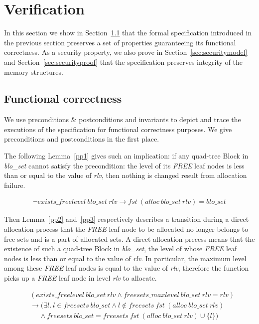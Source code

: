 \section{Verification}
In this section we show in Section~\ref{sec:functional} that the formal specification introduced in the previous section preserves a set of properties guaranteeing its functional correctness. As a security property, we also prove in Section~\ref{sec:securitymodel} and Section~\ref{sec:securityproof} that the specification preserves integrity of the memory structures.

\subsection{Functional correctness}\label{sec:functional}
We use preconditions $\&$ postconditions and invariants to depict and trace the executions of the specification for functional correctness purposes. We give preconditions and postconditions in the first place.

The following Lemma~\ref{pp1} gives such an implication: if any quad-tree Block in \emph{blo\_set} cannot satisfy the precondition: the level of its \emph{FREE} leaf nodes is less than or equal to the value of \emph{rlv}, then nothing is changed result from allocation failure.

\begin{lemma} 
\label{pp1}
\end{lemma}
\vspace{-7pt}
{\footnotesize
\begin{align*}
\neg exists\_freelevel\ blo\_set\ rlv \longrightarrow fst\ (alloc\ blo\_set\ rlv) = blo\_set
\end{align*}
}
\vspace{-12pt}

Then Lemma~\ref{pp2} and~\ref{pp3} respectively describes a transition during a direct allocation process that the \emph{FREE} leaf node to be allocated no longer belongs to free sets and is a part of allocated sets. A direct allocation precess means that the existence of such a quad-tree Block in \emph{blo\_set}, the level of whose \emph{FREE} leaf nodes is less than or equal to the value of \emph{rlv}. In particular, the maximum level among these \emph{FREE} leaf nodes is equal to the value of \emph{rlv}, therefore the function picks up a \emph{FREE} leaf node in level \emph{rlv} to allocate.

\begin{lemma} 
\label{pp2}
\end{lemma}
\vspace{-7pt}
{\footnotesize
\begin{align*}
&(exists\_freelevel\ blo\_set\ rlv \wedge freesets\_maxlevel\ blo\_set\ rlv = rlv) \\ &\longrightarrow (\exists l.\ l \in freesets\ blo\_set \wedge l \notin freesets\ fst\ (alloc\ blo\_set\ rlv) \\
&\ \ \ \ \ \ \wedge freesets\ blo\_set = freesets\ fst\ (alloc\ blo\_set\ rlv) \cup \lbrace l \rbrace)
\end{align*}
}
\vspace{-12pt}


